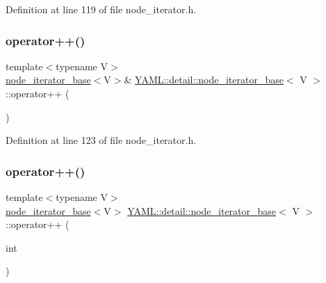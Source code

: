 Definition at line 119 of file node\+\_\+iterator.\+h.

\mbox{\label{class_y_a_m_l_1_1detail_1_1node__iterator__base_aa65eeb36a9c667f4317c3e2f0e3f132f}} 
\subsubsection{\texorpdfstring{operator++()}{operator++()}\hspace{0.1cm}{\footnotesize\ttfamily [1/2]}}
{\footnotesize\ttfamily template$<$typename V$>$ \\
\mbox{\hyperlink{class_y_a_m_l_1_1detail_1_1node__iterator__base}{node\+\_\+iterator\+\_\+base}}$<$V$>$\& \mbox{\hyperlink{class_y_a_m_l_1_1detail_1_1node__iterator__base}{Y\+A\+M\+L\+::detail\+::node\+\_\+iterator\+\_\+base}}$<$ V $>$\+::operator++ (\begin{DoxyParamCaption}{ }\end{DoxyParamCaption})\hspace{0.3cm}{\ttfamily [inline]}}



Definition at line 123 of file node\+\_\+iterator.\+h.

\mbox{\label{class_y_a_m_l_1_1detail_1_1node__iterator__base_aab470f2db1a20cae06f6fd90535e5ef6}} 
\subsubsection{\texorpdfstring{operator++()}{operator++()}\hspace{0.1cm}{\footnotesize\ttfamily [2/2]}}
{\footnotesize\ttfamily template$<$typename V$>$ \\
\mbox{\hyperlink{class_y_a_m_l_1_1detail_1_1node__iterator__base}{node\+\_\+iterator\+\_\+base}}$<$V$>$ \mbox{\hyperlink{class_y_a_m_l_1_1detail_1_1node__iterator__base}{Y\+A\+M\+L\+::detail\+::node\+\_\+iterator\+\_\+base}}$<$ V $>$\+::operator++ (\begin{DoxyParamCaption}\item[{int}]{ }\end{DoxyParamCaption})\hspace{0.3cm}{\ttfamily [inline]}}



